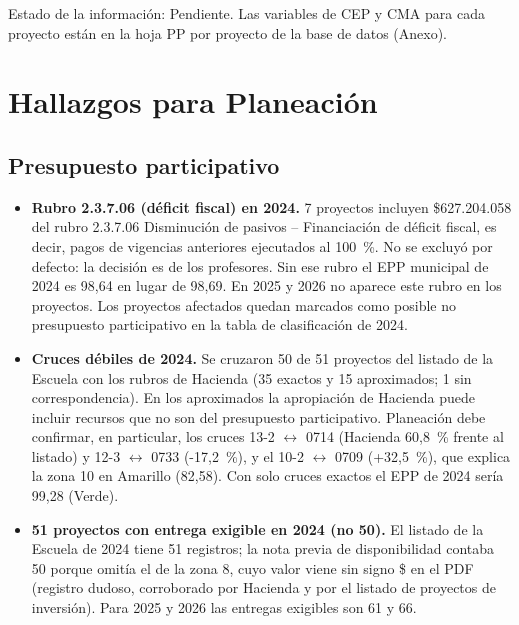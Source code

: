 \documentclass[11pt,letterpaper]{article}
\begin{document}
Estado de la información: Pendiente. Las variables de CEP y CMA para cada proyecto están en la hoja PP por proyecto de la base de datos (Anexo).

\section{Hallazgos para Planeación}

\subsection{Presupuesto participativo}

\begin{itemize}

\item \textbf{Rubro 2.3.7.06 (déficit fiscal) en 2024.} 7 proyectos incluyen \$627.204.058 del rubro 2.3.7.06 \guillemotleft{}Disminución de pasivos -- Financiación de déficit fiscal\guillemotright{}, es decir, pagos de vigencias anteriores ejecutados al 100~\%. No se excluyó por defecto: la decisión es de los profesores. Sin ese rubro el EPP municipal de 2024 es 98,64 en lugar de 98,69. En 2025 y 2026 no aparece este rubro en los proyectos. Los proyectos afectados quedan marcados como \guillemotleft{}posible no presupuesto participativo\guillemotright{} en la tabla de clasificación de 2024.

\item \textbf{Cruces débiles de 2024.} Se cruzaron 50 de 51 proyectos del listado de la Escuela con los rubros de Hacienda (35 exactos y 15 aproximados; 1 sin correspondencia). En los aproximados la apropiación de Hacienda puede incluir recursos que no son del presupuesto participativo. Planeación debe confirmar, en particular, los cruces 13-2 $\leftrightarrow$ 0714 (Hacienda 60,8~\% frente al listado) y 12-3 $\leftrightarrow$ 0733 (-17,2~\%), y el 10-2 $\leftrightarrow$ 0709 (+32,5~\%), que explica la zona 10 en Amarillo (82,58). Con solo cruces exactos el EPP de 2024 sería 99,28 (Verde).

\item \textbf{51 proyectos con entrega exigible en 2024 (no 50).} El listado de la Escuela de 2024 tiene 51 registros; la nota previa de disponibilidad contaba 50 porque omitía el de la zona 8, cuyo valor viene sin signo \guillemotleft{}\$\guillemotright{} en el PDF (registro dudoso, corroborado por Hacienda y por el listado de proyectos de inversión). Para 2025 y 2026 las entregas exigibles son 61 y 66.


\end{itemize}
\end{document}
